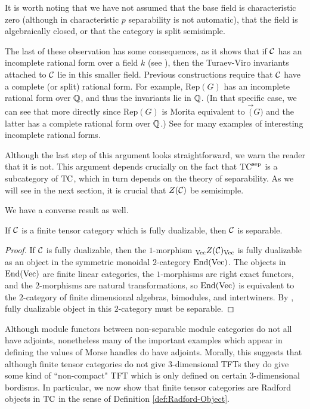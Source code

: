 \documentclass{amsart}
\begin{document}
\begin{remark}
It is worth noting that we have not assumed that the base field is characteristic zero (although in characteristic $p$ separability is not automatic), that the field is algebraically closed, or that the category is split semisimple.  

The last of these observation has some consequences, as it shows that if $\mathcal C$ has an incomplete rational form over a field $k$ (see \cite{1002.0168}), then the Turaev-Viro invariants attached to $\mathcal C$ lie in this smaller field.  Previous constructions require that $\mathcal C$ have a complete (or split) rational form.  For example, $\mathrm{Rep}(G)$ has an incomplete rational form over $\mathbb Q$, and thus the invariants lie in $\mathbb Q$.  (In that specific case, we can see that more directly since $\mathrm{Rep}(G)$ is Morita equivalent to $\Vec(G)$ and the latter has a complete rational form over $\mathbb Q$.)  See \cite{1102.0657} for many examples of interesting incomplete rational forms.
\end{remark}

\begin{warning}
Although the last step of this argument looks straightforward, we warn the reader that it is not.  This argument depends crucially on the fact that ${\mathrm{TC}^{\text{sep}}}$ is a subcategory of $\mathrm{TC}$, which in turn depends on the theory of separability.  As we will see in the next section, it is crucial that $Z(\mathcal C)$ be semisimple.
\end{warning}

We have a converse result as well.

\begin{maintheorem}
If $\mathcal C$ is a finite tensor category which is fully dualizable, then $\mathcal C$ is separable.
\end{maintheorem}
\begin{proof}
If $\mathcal C$ is fully dualizable, then the $1$-morphism ${}_{\mathrm{Vec}} Z(\mathcal C)_{\mathrm{Vec}}$ is fully dualizable as an object in the symmetric monoidal $2$-category $\operatorname{End}(\mathrm{Vec})$.  The objects in $\operatorname{End}(\mathrm{Vec})$ are finite linear categories, the $1$-morphisms are right exact functors, and the $2$-morphisms are natural transformations, so $\operatorname{End}(\mathrm{Vec})$ is equivalent to the $2$-category of finite dimensional algebras, bimodules, and intertwiners.  By \cite{???},  fully dualizable object in this $2$-category must be separable.
\end{proof}

Although module functors between non-separable module categories do not all have adjoints, nonetheless many of the important examples which appear in defining the values of Morse handles do have adjoints.  Morally, this suggests that although finite tensor categories do not give $3$-dimensional TFTs they do give some kind of ``non-compact" TFT which is only defined on certain $3$-dimensional bordisms.  In particular, we now show that finite tensor categories are Radford objects in $\mathrm{TC}$ in the sense of Definition \ref{def:Radford-Object}.
\end{document}
